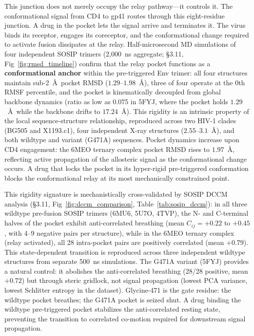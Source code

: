 \documentclass[11pt,a4paper]{article}
\begin{document}
This junction does not merely occupy the relay pathway---it controls it. The conformational signal from CD4 to gp41 routes through this eight-residue junction. A drug in the pocket lets the signal arrive and terminates it. The virus binds its receptor, engages its coreceptor, and the conformational change required to activate fusion dissipates at the relay. Half-microsecond MD simulations of four independent SOSIP trimers (2,000~ns aggregate; \S3.11, Fig~\ref{fig:rmsd_timeline}) confirm that the relay pocket functions as a \textbf{conformational anchor} within the pre-triggered Env trimer: all four structures maintain sub-2~\AA\ pocket RMSD ($1.29$--$1.98$~\AA), three of four operate at the 0th RMSF percentile, and the pocket is kinematically decoupled from global backbone dynamics (ratio as low as 0.075 in 5FYJ, where the pocket holds $1.29$~\AA\ while the backbone drifts to $17.24$~\AA). This rigidity is an intrinsic property of the local sequence-structure relationship, reproduced across two HIV-1 clades (BG505 and X1193.c1), four independent X-ray structures ($2.55$--$3.1$~\AA), and both wildtype and variant (G471A) sequences. Pocket dynamics increase upon CD4 engagement: the 6MEO ternary complex pocket RMSD rises to $1.97$~\AA, reflecting active propagation of the allosteric signal as the conformational change occurs. A drug that locks the pocket in its hyper-rigid pre-triggered conformation blocks the conformational relay at its most mechanically constrained point.

This rigidity signature is mechanistically cross-validated by SOSIP DCCM analysis (\S3.11, Fig~\ref{fig:dccm_comparison}, Table~\ref{tab:sosip_dccm}): in all three wildtype pre-fusion SOSIP trimers (6MU6, 5U7O, 4TVP), the N- and C-terminal halves of the pocket exhibit anti-correlated breathing (mean $C_{ij} = +0.22$ to $+0.45$, with 4--9 negative pairs per structure), while in the 6MEO ternary complex (relay activated), all 28 intra-pocket pairs are positively correlated (mean $+0.79$). This state-dependent transition is reproduced across three independent wildtype structures from separate 500~ns simulations. The G471A variant (5FYJ) provides a natural control: it abolishes the anti-correlated breathing (28/28 positive, mean $+0.72$) but through steric gridlock, not signal propagation (lowest PCA variance, lowest Schlitter entropy in the dataset). Glycine-471 is the gate residue: the wildtype pocket breathes; the G471A pocket is seized shut. A drug binding the wildtype pre-triggered pocket stabilizes the anti-correlated resting state, preventing the transition to correlated co-motion required for downstream signal propagation.
\end{document}
